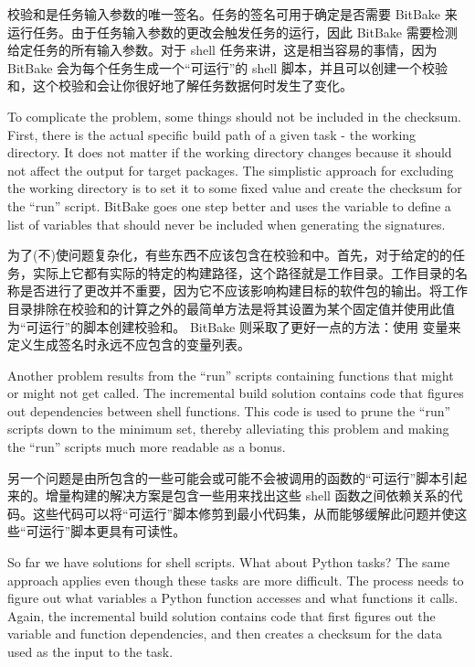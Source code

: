 校验和是任务输入参数的唯一签名。任务的签名可用于确定是否需要 BitBake 来运行任务。由于任务输入参数的更改会触发任务的运行，因此 BitBake 需要检测给定任务的所有输入参数。对于 shell 任务来讲，这是相当容易的事情，因为 BitBake 会为每个任务生成一个``可运行''的 shell 脚本，并且可以创建一个校验和，这个校验和会让你很好地了解任务数据何时发生了变化。

To complicate the problem, some things should not be included in the checksum. First, there is the actual specific build path of a given task - the working directory. It does not matter if the working directory changes because it should not affect the output for target packages. The simplistic approach for excluding the working directory is to set it to some fixed value and create the checksum for the ``run'' script. BitBake goes one step better and uses the  variable to define a list of variables that should never be included when generating the signatures.

为了(不)使问题复杂化，有些东西不应该包含在校验和中。首先，对于给定的的任务，实际上它都有实际的特定的构建路径，这个路径就是工作目录。工作目录的名称是否进行了更改并不重要，因为它不应该影响构建目标的软件包的输出。将工作目录排除在校验和的计算之外的最简单方法是将其设置为某个固定值并使用此值为``可运行''的脚本创建校验和。 BitBake 则采取了更好一点的方法：使用  变量来定义生成签名时永远不应包含的变量列表。

Another problem results from the ``run'' scripts containing functions that might or might not get called. The incremental build solution contains code that figures out dependencies between shell functions. This code is used to prune the ``run'' scripts down to the minimum set, thereby alleviating this problem and making the ``run'' scripts much more readable as a bonus.

另一个问题是由所包含的一些可能会或可能不会被调用的函数的``可运行''脚本引起来的。增量构建的解决方案是包含一些用来找出这些 shell 函数之间依赖关系的代码。这些代码可以将``可运行''脚本修剪到最小代码集，从而能够缓解此问题并使这些``可运行''脚本更具有可读性。

So far we have solutions for shell scripts. What about Python tasks? The same approach applies even though these tasks are more difficult. The process needs to figure out what variables a Python function accesses and what functions it calls. Again, the incremental build solution contains code that first figures out the variable and function dependencies, and then creates a checksum for the data used as the input to the task.

